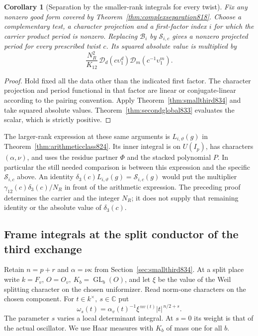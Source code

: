 \documentclass[a4paper,11pt]{article}
\newtheorem{corollary}[proposition]{Corollary}
\theoremstyle{definition}
\theoremstyle{remark}
\numberwithin{equation}{section}
\begin{document}
\begin{corollary}[Separation by the smaller-rank integrals for every twist]
\leavevmode\label{cor:smallthirdseparation834}
Fix any nonzero good form covered by
Theorem~\ref{thm:complexseparation818}. Choose a complementary
test, a character projection and a first-factor index \(i\)
for which the carrier product period is nonzero. Replacing
\(\mathcal B_i\) by \(\mathcal S_{i,c}\) gives a nonzero
projected period for every prescribed twist \(c\). Its
squared absolute value is multiplied by
\[
        \frac{N_R^2}{K_{12}}\,
           \mathcal D_d(c\upsilon_1^d)
           \mathcal D_m(c^{-1}\upsilon_1^m).
\]
\end{corollary}
\begin{proof}
Hold fixed all the data other than the indicated first
factor. The character projection and period functional
in that factor are linear or conjugate-linear according
to the pairing convention. Apply Theorem~\ref{thm:smallthird834}
and take squared absolute values. Theorem~\ref{thm:secondglobal833}
evaluates the scalar, which is strictly positive.
\end{proof}

The larger-rank expression at these same arguments is
\(L_{i,\vartheta}(g)\) in Theorem~\ref{thm:arithmeticclass824}.
Its inner integral is on \(U(I_p)\), has characters
\((\alpha,\nu)\), and uses the residue partner \(\Phi\)
and the stacked polynomial \(P\). In particular the still
needed comparison is between this expression and the
specific \(\mathcal S_{i,c}\) above. An identity
\(\delta_3(c)L_{i,\vartheta}(g)=\mathcal S_{i,c}(g)\)
would put the multiplier \(\gamma_{12}(c)\delta_3(c)/N_R\)
in front of the arithmetic expression. The preceding proof
determines the carrier and the integer \(N_R\); it does not
supply that remaining identity or the absolute value of
\(\delta_3(c)\).
\clearpage

\subsection{Frame integrals at the split conductor of the third exchange}
\label{sec:marksections835}
Retain \(n=p+r\) and \(\alpha=\nu\kappa\) from
Section~\ref{sec:smallthird834}. At a split place write \(k=F_v\),
\(O=O_v,\ K_b=\operatorname{GL}_b(O)\), and let \(\xi\) be the
value of the Weil splitting character on the chosen uniformizer.
Read norm-one characters on the chosen component. For
\(t\in k^\times,\ s\in\mathbb C\) put
\[
 \omega_s(t)=\alpha_v(t)^{-1}\xi^{\,n v(t)}|t|^{\,n/2+s}.
\]
The parameter \(s\) varies a local determinant integral.
At \(s=0\) its weight is that of the actual oscillator.
We use Haar measures with \(K_b\) of mass one for all \(b\).
\end{document}
